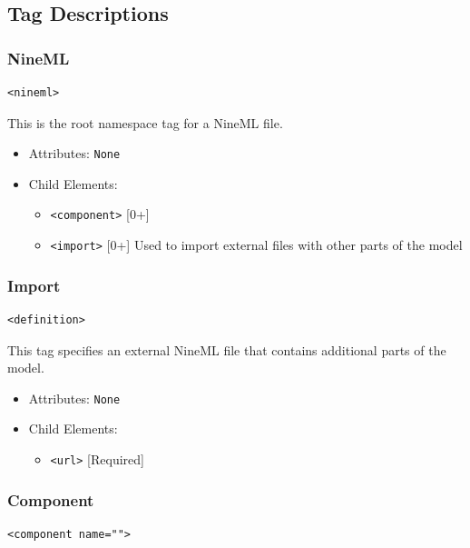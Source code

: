 \documentclass{article}
\begin{document}
\subsection{Tag Descriptions}

\subsubsection{NineML}
%
\begin{lstlisting}
<nineml>
\end{lstlisting}

This is the root namespace tag for a NineML file.

\begin{itemize}
\item Attributes: \texttt{None}

\item Child Elements:
%
\begin{itemize}
\item \verb|<component>| {[}0+{]}
\item \verb|<import>| {[}0+{]} Used to import external files with
other parts of the model
\end{itemize}

\end{itemize}

\subsubsection{Import}
%
\begin{lstlisting}
<definition>
\end{lstlisting}

This tag specifies an external NineML file that contains additional
parts of the model.

\begin{itemize}
\item Attributes: \texttt{None}

\item Child Elements:
%
\begin{itemize}
\item \verb|<url>| {[}Required{]}
\end{itemize}

\end{itemize}

\subsubsection{Component}
%
\begin{lstlisting}
<component name="">
\end{lstlisting}
\end{document}
